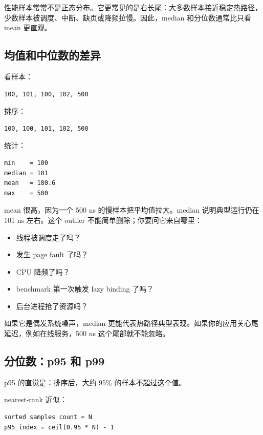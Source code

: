 \begin{deepdive}
性能样本常常不是正态分布。它更常见的是右长尾：大多数样本接近稳定热路径，少数样本被调度、中断、缺页或降频拉慢。因此，median 和分位数通常比只看 mean 更直观。
\end{deepdive}

\subsection{均值和中位数的差异}

看样本：

\begin{lstlisting}
100, 101, 100, 102, 500
\end{lstlisting}

排序：

\begin{lstlisting}
100, 100, 101, 102, 500
\end{lstlisting}

统计：

\begin{lstlisting}
min    = 100
median = 101
mean   = 180.6
max    = 500
\end{lstlisting}

mean 很高，因为一个 500 ns 的慢样本把平均值拉大。median 说明典型运行仍在 101 ns 左右。这个 outlier 不能简单删除；你要问它来自哪里：

\begin{itemize}
  \item 线程被调度走了吗？
  \item 发生 page fault 了吗？
  \item CPU 降频了吗？
  \item benchmark 第一次触发 lazy binding 了吗？
  \item 后台进程抢了资源吗？
\end{itemize}

如果它是偶发系统噪声，median 更能代表热路径典型表现。如果你的应用关心尾延迟，例如在线服务，500 ns 这个尾部就不能忽略。

\subsection{分位数：p95 和 p99}

p95 的直觉是：排序后，大约 95\% 的样本不超过这个值。

nearest-rank 近似：

\begin{lstlisting}
sorted samples count = N
p95 index = ceil(0.95 * N) - 1
\end{lstlisting}

